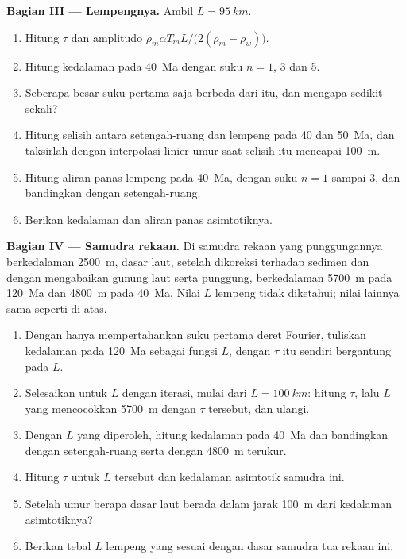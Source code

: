 \begin{problem}
\medskip\noindent\textbf{Bagian III --- Lempengnya.} Ambil $L = \qty{95}{km}$.
\begin{enumerate}[resume]
  \item Hitung $\tau$ dan amplitudo $\rho_m\alpha T_mL/\bigl(2(\rho_m -
        \rho_w)\bigr)$.
  \item Hitung kedalaman pada \qty{40}{Ma} dengan suku $n = 1$, 3 dan 5.
  \item Seberapa besar suku pertama saja berbeda dari itu, dan mengapa
        sedikit sekali?
  \item Hitung selisih antara setengah-ruang dan lempeng pada 40 dan
        \qty{50}{Ma}, dan taksirlah dengan interpolasi linier umur saat selisih
        itu mencapai \qty{100}{m}.
  \item Hitung aliran panas lempeng pada \qty{40}{Ma}, dengan suku
        $n = 1$ sampai 3, dan bandingkan dengan setengah-ruang.
  \item Berikan kedalaman dan aliran panas asimtotiknya.
\end{enumerate}

\medskip\noindent\textbf{Bagian IV --- Samudra rekaan.} Di samudra rekaan
yang punggungannya berkedalaman \qty{2500}{m}, dasar laut, setelah dikoreksi terhadap sedimen
dan dengan mengabaikan gunung laut serta punggung, berkedalaman \qty{5700}{m} pada \qty{120}{Ma} dan
\qty{4800}{m} pada \qty{40}{Ma}. Nilai $L$ lempeng tidak diketahui; nilai lainnya
sama seperti di atas.
\begin{enumerate}[resume]
  \item Dengan hanya mempertahankan suku pertama deret Fourier, tuliskan kedalaman pada
        \qty{120}{Ma} sebagai fungsi $L$, dengan $\tau$ itu sendiri bergantung pada
        $L$.
  \item Selesaikan untuk $L$ dengan iterasi, mulai dari $L = \qty{100}{km}$:
        hitung $\tau$, lalu $L$ yang mencocokkan \qty{5700}{m} dengan $\tau$
        tersebut, dan ulangi.
  \item Dengan $L$ yang diperoleh, hitung kedalaman pada \qty{40}{Ma} dan
        bandingkan dengan setengah-ruang serta dengan \qty{4800}{m} terukur.
  \item Hitung $\tau$ untuk $L$ tersebut dan kedalaman asimtotik samudra ini.
  \item Setelah umur berapa dasar laut berada dalam jarak \qty{100}{m} dari
        kedalaman asimtotiknya?
  \item Berikan tebal $L$ lempeng yang sesuai dengan dasar samudra tua
        rekaan ini.
\end{enumerate}
\end{problem}
